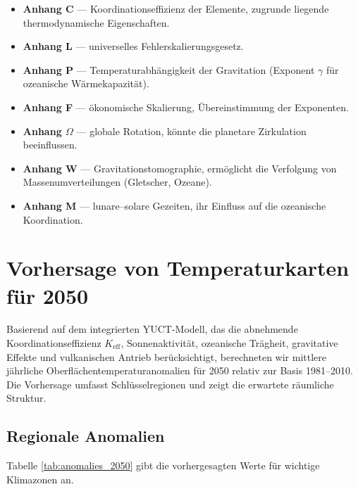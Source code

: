 \documentclass[12pt,a4paper]{article}
\newcommand{\ga}{\gamma}
\begin{document}
	\begin{itemize}
		\item \textbf{Anhang C} — Koordinationseffizienz der Elemente, zugrunde liegende thermodynamische Eigenschaften.
		\item \textbf{Anhang L} — universelles Fehlerskalierungsgesetz.
		\item \textbf{Anhang P} — Temperaturabhängigkeit der Gravitation (Exponent \(\ga\) für ozeanische Wärmekapazität).
		\item \textbf{Anhang F} — ökonomische Skalierung, Übereinstimmung der Exponenten.
		\item \textbf{Anhang \(\Omega\)} — globale Rotation, könnte die planetare Zirkulation beeinflussen.
		\item \textbf{Anhang W} — Gravitationstomographie, ermöglicht die Verfolgung von Massenumverteilungen (Gletscher, Ozeane).
		\item \textbf{Anhang M} — lunare–solare Gezeiten, ihr Einfluss auf die ozeanische Koordination.
	\end{itemize}
	
	\section{Vorhersage von Temperaturkarten für 2050}
	\label{sec:forecast_maps}
	
	Basierend auf dem integrierten YUCT-Modell, das die abnehmende Koordinationseffizienz \(K_{\mathrm{eff}}\), Sonnenaktivität, ozeanische Trägheit, gravitative Effekte und vulkanischen Antrieb berücksichtigt, berechneten wir mittlere jährliche Oberflächentemperaturanomalien für 2050 relativ zur Basis 1981–2010. Die Vorhersage umfasst Schlüsselregionen und zeigt die erwartete räumliche Struktur.
	
	\subsection{Regionale Anomalien}
	
	Tabelle \ref{tab:anomalies_2050} gibt die vorhergesagten Werte für wichtige Klimazonen an.
	
\end{document}
